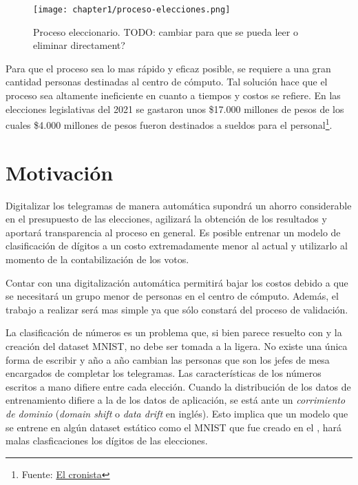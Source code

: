 \begin{figure}[H]
    \centering
    \texttt{[image: chapter1/proceso-elecciones.png]}
    \caption{Proceso eleccionario. TODO: cambiar para que se pueda leer o eliminar directament?}
    \label{fig:proceso-elecciones}
\end{figure}

Para que el proceso sea lo mas r\'apido y eficaz posible, se requiere a una gran cantidad personas destinadas al centro
de c\'omputo. Tal soluci\'on hace que el proceso sea altamente ineficiente en cuanto a tiempos y costos se refiere. En
las elecciones legislativas del 2021 se gastaron unos \$17.000 millones de pesos de los cuales \$4.000 millones de
pesos fueron destinados a sueldos para el personal\footnote{Fuente:
    \href{https://www.cronista.com/economia-politica/Elecciones-legislativas-2021-cuanto-mas-se-gastara-por-el-coronavirus-segun-el-Presupuesto-20201004-0006.html}{El
        cronista}}.

\section{Motivaci\'on}

Digitalizar los telegramas de manera autom\'atica supondr\'a un ahorro considerable en el presupuesto de las
elecciones, agilizar\'a la obtenci\'on de los resultados y aportar\'a transparencia al proceso en general. Es posible
entrenar un modelo de clasificaci\'on de d\'igitos a un costo extremadamente menor al actual y utilizarlo al momento de
la contabilizaci\'on de los votos.

Contar con una digitalizaci\'on autom\'atica permitir\'a bajar los costos debido a que se necesitar\'a un grupo menor
de personas en el centro de c\'omputo. Adem\'as, el trabajo a realizar ser\'a mas simple ya que s\'olo constar\'a del
proceso de validaci\'on.

La clasificaci\'on de n\'umeros es un problema que, si bien parece resuelto con \cite{lecun1998gradient} y la
creaci\'on del dataset MNIST, no debe ser tomada a la ligera. No existe una \'unica forma de escribir y a\~{n}o a
a\~{n}o cambian las personas que son los jefes de mesa encargados de completar los telegramas. Las caracter\'isticas de
los n\'umeros escritos a mano difiere entre cada elecci\'on. Cuando la distribuci\'on de los datos de entrenamiento
difiere a la de los datos de aplicaci\'on, se est\'a ante un {\it corrimiento de dominio} ({\it domain shift} o {\it
        data drift} en ingl\'es). Esto implica que un modelo que se entrene en alg\'un dataset est\'atico como el MNIST que fue
creado en el \citeyear{lecun1998gradient}, har\'a malas clasficaciones los d\'igitos de las elecciones.

